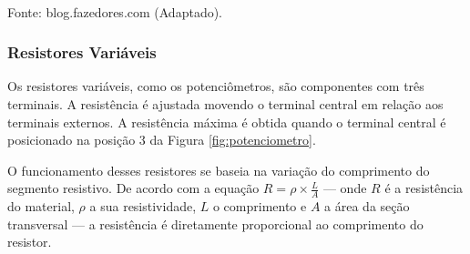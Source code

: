 \documentclass[12pt]{article}
\begin{document}
    \begin{table}[H]
        \caption{Tabela do cores dos resistores fixos.}
        \label{tab:corResist}
        \centering
        \\
        \footnotesize Fonte: blog.fazedores.com (Adaptado)\nocite{codigo_cores_resistores}.
    \end{table}

    \subsubsection{Resistores Variáveis}
    Os resistores variáveis, como os potenciômetros, são componentes com três terminais. A resistência é ajustada movendo o terminal central em relação aos terminais externos. A resistência máxima é obtida quando o terminal central é posicionado na posição 3 da Figura \ref{fig:potenciometro}.
    
    O funcionamento desses resistores se baseia na variação do comprimento do segmento resistivo. De acordo com a equação $R = \rho\times\frac{L}{A}$ --- onde $R$ é a resistência do material, $\rho$ a sua resistividade, $L$ o comprimento e $A$ a área da seção transversal --- a resistência é diretamente proporcional ao comprimento do resistor.
    
\end{document}
